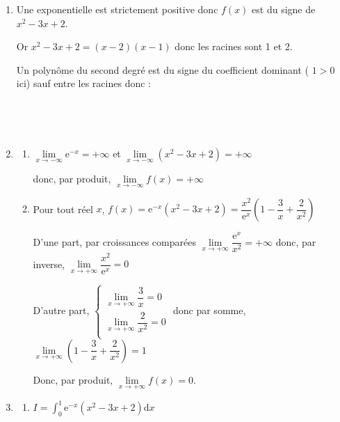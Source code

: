 \documentclass[10pt]{article}
\providecommand{\e}{{\mathrm{e}}}
\renewcommand{\d}{{\mathrm{d}}}
\begin{document}
	\begin{enumerate}
		\item  Une exponentielle est strictement positive donc  $f(x)$ est du signe  de $x^2-3x+2$.

		Or $x^2-3x+2 = (x-2)(x-1)$ donc les racines sont 1 et 2.

		Un polynôme du second degré est du signe du coefficient dominant ( $1>0$ ici) sauf entre les racines donc :

		\hfill~
		\hfill~




		\item \begin{enumerate}
			\item  $\lim\limits_{x \to - \infty} \e^{-x}= +\infty$ et $\lim\limits_{x \to -\infty} \left(x^{2}-3 x+2\right) = + \infty$

			donc, par produit, $\lim\limits_{x \to - \infty} f(x)= +\infty$


			\item  Pour tout réel $x$, $f(x) = \e^{-x}\left(x^{2}-3 x+2\right) = \dfrac{x^2}{\e^x} \left(1 - \dfrac{3}{x} +\dfrac{2}{x^2} \right)$

			D'une part, par croissances comparées $ \lim\limits_{x \to + \infty} \dfrac{\e^{x}}{x^2} = +\infty$  donc,  par inverse, $ \lim\limits_{x \to + \infty} \dfrac{x^2}{\e^{x}} = 0$


			D'autre part, $\begin{cases}
				\lim\limits_{x \to +\infty } \dfrac{3}{x} =0\\
				\lim\limits_{x \to +\infty } \dfrac{2}{x^2} =0\\
			\end{cases}$ donc par somme, $ \lim\limits_{x \to + \infty}\left(1 - \dfrac{3}{x} +\dfrac{2}{x^2} \right) =1$

			Donc, par produit, $\lim\limits_{x \to + \infty} f(x) =0$.


		\end{enumerate}

		\item

		\begin{enumerate}
			\item  $\displaystyle I=\int_{0}^{1} \e^{-x}\left(x^{2}-3 x+2\right)  \d x  $


\end{enumerate}
\end{enumerate}
\end{document}
